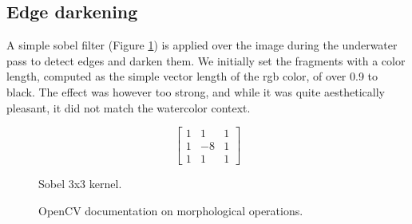 \documentclass{article}
\begin{document}
\subsection{Edge darkening}

\noindent
A simple sobel filter (Figure \ref{fig:sobel}) is applied over the image during the underwater pass 
to detect edges and darken them. We initially set the fragments with a color length, computed as the simple
vector length of the rgb color, of over 0.9 to black. The effect was however too strong, and while it was quite
aesthetically pleasant, it did not match the watercolor context.

\begin{figure}[!h]
    $$
    \begin{bmatrix}
        1 & 1 & 1\\
        1 & -8 & 1 \\
        1 & 1 & 1
    \end{bmatrix}
    $$
    \caption{Sobel 3x3 kernel.}
    \label{fig:sobel}
\end{figure}

\begin{figure}[h]
    \centering
    \hspace{1em}
    \caption{OpenCV documentation on morphological operations.}
    \label{fig:initial_edge_darkening}
\end{figure}
\end{document}
